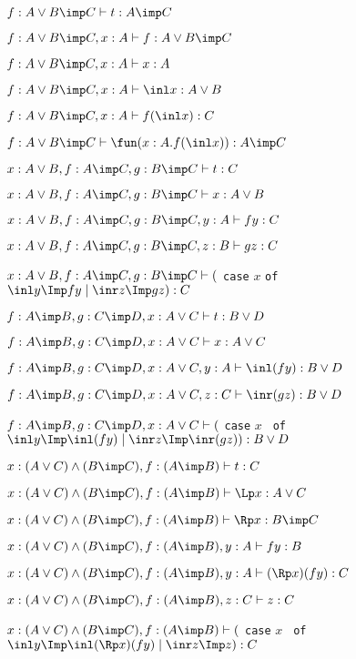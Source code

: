 \documentclass[11pt,letterpaper]{article}
\begin{document}
    \ee
  
  \item $f:A\lor B\imp C\vdash t:A\imp C$
    \be
    \item $f:A\lor B\imp C, x:A\vdash f:A\lor B\imp C$
      \item $f:A\lor B\imp C, x:A\vdash x:A$
      \item $f:A\lor B\imp C, x:A\vdash \inl x:A\lor B$
        \item $f:A\lor B\imp C, x:A\vdash f(\inl x):C$
          \item $f:A\lor B\imp C \vdash \fun(x:A.f(\inl x)):A\imp C$
    \ee

\item $x:A\lor B, f:A\imp C, g:B\imp C\vdash t:C$
\be
 \item $x:A\lor B, f:A\imp C, g:B\imp C\vdash x: A\lor B $
 \item $x:A\lor B, f:A\imp C, g:B\imp C, y:A\vdash f y: C $
 \item $x:A\lor B, f:A\imp C, g:B\imp C, z:B\vdash g z:C $
 \item $x:A\lor B, f:A\imp C, g:B\imp C\vdash ($ {\tt case} $x$ {\tt of} 
 $\inl y\Imp fy\mid\inr z\Imp gz): C$
\ee
    
\item $f: A\imp B, g: C\imp D, x:A\lor C\vdash t:B\lor D$

  \be
  \item $f: A\imp B, g: C\imp D, x:A\lor C\vdash x:A\lor C$
    \item $f: A\imp B, g: C\imp D, x:A\lor C, y:A\vdash \inl
      (fy):B\lor D$
          \item $f: A\imp B, g: C\imp D, x:A\lor C, z:C\vdash\inr
            (gz):B\lor D$
                \item $f: A\imp B, g: C\imp D, x:A\lor C\vdash ($ {\tt case} 
$x$ {\tt
        of} $\inl y\Imp \inl (fy)\mid\inr z\Imp \inr (gz)): B\lor D$
  \ee


\item $x: (A\lor C)\land (B\imp C), f:(A\imp B)\vdash t:C$

  \be
  \item $x: (A\lor C)\land (B\imp C), f:(A\imp B)\vdash \Lp x:A\lor C$
    \item $x: (A\lor C)\land (B\imp C), f:(A\imp B)\vdash \Rp x:B\imp
      C$
      \item $x: (A\lor C)\land (B\imp C), f:(A\imp B), y:A\vdash fy: B$
        \item $x: (A\lor C)\land (B\imp C), f:(A\imp B), y:A\vdash
          (\Rp x)(fy): C$
          \item $x: (A\lor C)\land (B\imp C), f:(A\imp B), z:C\vdash
            z: C$
            \item $x: (A\lor C)\land (B\imp C), f:(A\imp B)\vdash ($ {\tt case} 
$x$ {\tt
        of} $\inl y\Imp \inl (\Rp x)(fy)\mid\inr z\Imp z): C$
  \ee
  
\end{document}

